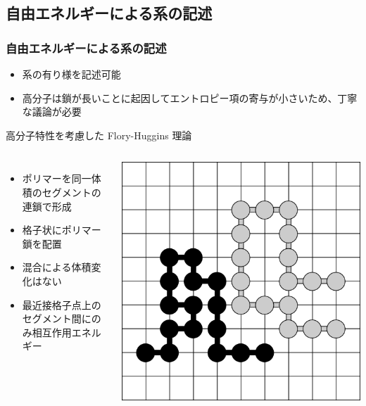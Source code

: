 \documentclass[unicode,12pt]{beamer}%
\begin{document}
\subsection{自由エネルギーによる系の記述}
\begin{frame}\frametitle{自由エネルギーによる系の記述}
	\begin{itemize}
		\item 系の\alert{有り様}を記述可能
		\item \alert{高分子は鎖が長いことに起因してエントロピー項の寄与が小さいため、丁寧な議論が必要}
	\end{itemize}

	\begin{block}{高分子特性を考慮した Flory-Huggins 理論}
		\begin{columns}[c, onlytextwidth]
			\begin{itemize}
				\item ポリマーを同一体積のセグメントの連鎖で形成
				\item 格子状にポリマー鎖を配置
				\item 混合による体積変化はない
				\item 最近接格子点上のセグメント間にのみ相互作用エネルギー
			\end{itemize}
					\centering
						\includegraphics[width=\textwidth]{FH_model.png}
				
		\end{columns}
	\end{block}
\end{frame}
\end{document}
